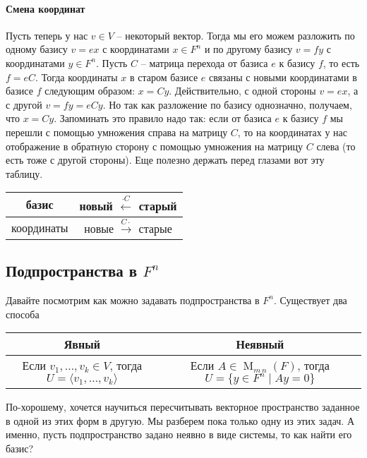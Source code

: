 \paragraph{Смена координат}

Пусть теперь у нас $v\in V$ -- некоторый вектор.
Тогда мы его можем разложить по одному базису $v = ex$ с координатами $x\in F^n$ и по другому базису $v = f y$ с координатами $y \in F^n$.
Пусть $C$ -- матрица перехода от базиса $e$ к базису $f$, то есть $f = e C$.
Тогда координаты $x$ в старом базисе $e$ связаны с новыми координатами в базисе $f$ следующим образом: $x = Cy$.
Действительно, с одной стороны $v = ex$, а с другой $v = f y = eC y$.
Но так как разложение по базису однозначно, получаем, что $x = Cy$.
Запоминать это правило надо так: если от базиса $e$ к базису $f$ мы перешли с помощью умножения справа на матрицу $C$, то на координатах у нас отображение в обратную сторону с помощью умножения на матрицу $C$ слева (то есть тоже с другой стороны).
Еще полезно держать перед глазами вот эту таблицу.
\begin{center}
\begin{tabular}{c|c}
{базис}&{новый $\stackrel{\cdot C}{\longleftarrow}$ старый}\\
\hline
{координаты}&{новые $\stackrel{C\cdot}{\longrightarrow}$ старые}\\
\end{tabular}
\end{center}


\subsection{Подпространства в $F^n$}
\label{section::Subspaces}

Давайте посмотрим как можно задавать подпространства в $F^n$.
Существует два способа
\vspace{3pt}

\begin{tabular}{c|c}
{\bf Явный}&{\bf Неявный}\\
\hline
{Если $v_1,\ldots,v_k\in V$, тогда $U = \langle v_1,\ldots, v_k \rangle$}&{Если $A\in \operatorname{M}_{m\,n}(F)$, тогда $U = \{y\in F^n \mid Ay = 0\}$}\\
\end{tabular}
\vspace{3pt}

По-хорошему, хочется научиться пересчитывать векторное пространство заданное в одной из этих форм в другую.
Мы разберем пока только одну из этих задач.
А именно, пусть подпространство задано неявно в виде системы, то как найти его базис?

